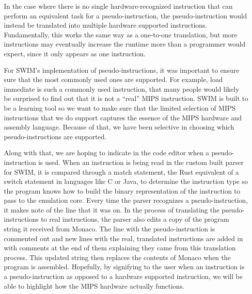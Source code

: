 \documentclass[
    paper=letter,
    parskip=half,
    fontsize=12pt,
    titlepage=firstiscover,
    toc=bibliography,
    numbers=endperiod
]{scrartcl}
\begin{document}
In the case where there is no single hardware-recognized instruction
that can perform an equivalent task for a pseudo-instruction, the
pseudo-instruction would instead be translated into multiple hardware
supported instructions. Fundamentally, this works the same way as a
one-to-one translation, but more instructions may eventually increase
the runtime more than a programmer would expect, since it only appears
as one instruction.

For SWIM's implementation of pseudo-instructions, it was important to
ensure sure that the most commonly used ones are supported. For example,
load immediate is such a commonly used instruction, that many people
would likely be surprised to find out that it is not a ``real'' MIPS
instruction. SWIM is built to be a learning tool so we want to make sure
that the limited selection of MIPS instructions that we do support
captures the essence of the MIPS hardware and assembly language. Because
of that, we have been selective in choosing which pseudo-instructions
are supported.

Along with that, we are hoping to indicate in the code editor when a
pseudo-instruction is used. When an instruction is being read in the
custom built parser for SWIM, it is compared through a match statement,
the Rust equivalent of a switch statement in languages like C or Java,
to determine the instruction type so the program knows how to build the
binary representation of the instruction to pass to the emulation core.
Every time the parser recognizes a pseudo-instruction, it makes note of
the line that it was on. In the process of translating the
pseudo-instructions to real instructions, the parser also edits a copy
of the program string it received from Monaco. The line with the
pseudo-instruction is commented out and new lines with the real,
translated instructions are added in with comments at the end of them
explaining they came from this translation process. This updated string
then replaces the contents of Monaco when the program is assembled.
Hopefully, by signifying to the user when an instruction is a
pseudo-instruction as opposed to a hardware supported instruction, we
will be able to highlight how the MIPS hardware actually functions.
\end{document}
